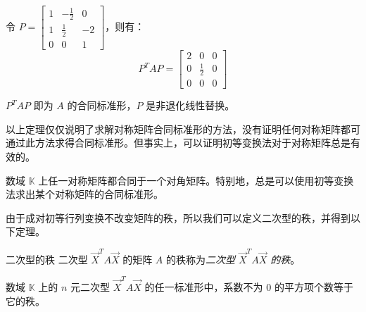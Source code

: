 \begin{solve}
	令 $P = \begin{bmatrix} 1 & -\frac{1}{2} & 0 \\ 1 & \frac{1}{2} & -2 \\ 0 & 0 & 1 \end{bmatrix}$，则有：
	$$
	P^T A P =
	\begin{bmatrix}
		2 & 0 & 0
		\\
		0 & \frac{1}{2} & 0
		\\
		0 & 0 & 0
	\end{bmatrix}
	$$

	$P^T A P$ 即为 $A$ 的合同标准形，$P$ 是非退化线性替换。
\end{solve}

以上定理仅仅说明了求解对称矩阵合同标准形的方法，没有证明任何对称矩阵都可通过此方法求得合同标准形。但事实上，可以证明初等变换法对于对称矩阵总是有效的。

\begin{theorem}
	数域 $\mathbb K$ 上任一对称矩阵都合同于一个对角矩阵。特别地，总是可以使用初等变换法求出某个对称矩阵的合同标准形。
\end{theorem}


由于成对初等行列变换不改变矩阵的秩，所以我们可以定义二次型的秩，并得到以下定理。

\begin{definition}{二次型的秩}
	二次型 $\vec X^T A \vec X$ 的矩阵 $A$ 的秩称为\emph{二次型 $\vec X^T A \vec X$ 的秩}。
\end{definition}

\begin{theorem}
	数域 $\mathbb K$ 上的 $n$ 元二次型 $\vec X^T A \vec X$ 的任一标准形中，系数不为 $0$ 的平方项个数等于它的秩。
\end{theorem}